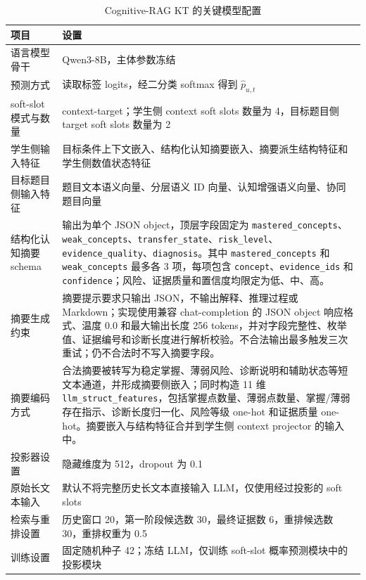 \documentclass[UTF8,a4paper,12pt]{ctexart}
\numberwithin{table}{section}
\begin{document}
\begin{table}[htbp]
\centering
\small
\caption{Cognitive-RAG KT 的关键模型配置}
\label{tab:appendix-main-method-config}
\begin{tabularx}{\textwidth}{p{3.8cm}X}
\toprule
\textbf{项目} & \textbf{设置} \\
\midrule
语言模型骨干 & Qwen3-8B，主体参数冻结 \\
预测方式 & 读取标签 logits，经二分类 softmax 得到 \(\hat{p}_{u,t}\) \\
soft-slot 模式与数量 & context-target；学生侧 context soft slots 数量为 4，目标题目侧 target soft slots 数量为 2 \\
学生侧输入特征 & 目标条件上下文嵌入、结构化认知摘要嵌入、摘要派生结构特征和学生侧数值状态特征 \\
目标题目侧输入特征 & 题目文本语义向量、分层语义 ID 向量、认知增强语义向量、协同题目向量 \\
结构化认知摘要 schema & 输出为单个 JSON object，顶层字段固定为 \texttt{mastered\_concepts}、\texttt{weak\_concepts}、\texttt{transfer\_state}、\texttt{risk\_level}、\texttt{evidence\_quality}、\texttt{diagnosis}。其中 \texttt{mastered\_concepts} 和 \texttt{weak\_concepts} 最多各 3 项，每项包含 \texttt{concept}、\texttt{evidence\_ids} 和 \texttt{confidence}；风险、证据质量和置信度均限定为低、中、高。 \\
摘要生成约束 & 摘要提示要求只输出 JSON，不输出解释、推理过程或 Markdown；实现使用兼容 chat-completion 的 JSON object 响应格式、温度 0.0 和最大输出长度 256 tokens，并对字段完整性、枚举值、证据编号和诊断长度进行解析校验。不合法输出最多触发三次重试；仍不合法时不写入摘要字段。 \\
摘要编码方式 & 合法摘要被转写为稳定掌握、薄弱风险、诊断说明和辅助状态等短文本通道，并形成摘要侧嵌入；同时构造 11 维 \texttt{llm\_struct\_features}，包括掌握点数量、薄弱点数量、掌握/薄弱存在指示、诊断长度归一化、风险等级 one-hot 和证据质量 one-hot。摘要嵌入与结构特征合并到学生侧 context projector 的输入中。 \\
投影器设置 & 隐藏维度为 512，dropout 为 0.1 \\
原始长文本输入 & 默认不将完整历史长文本直接输入 LLM，仅使用经过投影的 soft slots \\
检索与重排设置 & 历史窗口 20，第一阶段候选数 30，最终证据数 6，重排候选数 30，重排权重为 0.5 \\
训练设置 & 固定随机种子 42；冻结 LLM，仅训练 soft-slot 概率预测模块中的投影模块 \\
\bottomrule
\end{tabularx}
\end{table}
\end{document}
